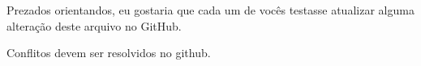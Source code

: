 \documentclass{article}
\begin{document}
Prezados orientandos,
eu gostaria que cada um de vocês testasse atualizar alguma alteração deste arquivo no GitHub.

Conflitos devem ser resolvidos no github.
\end{document}
